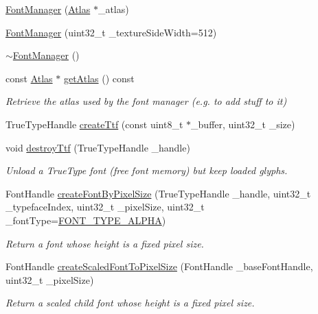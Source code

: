 \begin{DoxyCompactItemize}
\item 
\hyperlink{class_font_manager_ad508580de43f7ae8e599465e920a667b}{Font\+Manager} (\hyperlink{class_atlas}{Atlas} $\ast$\+\_\+atlas)
\item 
\hyperlink{class_font_manager_a8e70d9a8d27b275c249cc2e6f1814599}{Font\+Manager} (uint32\+\_\+t \+\_\+texture\+Side\+Width=512)
\item 
\hyperlink{class_font_manager_aa190bb023b4cf2ad28e24c69ef57f380}{$\sim$\+Font\+Manager} ()
\item 
const \hyperlink{class_atlas}{Atlas} $\ast$ \hyperlink{class_font_manager_a8e27c0180aa58188e256f73f45b2efd4}{get\+Atlas} () const 
\begin{DoxyCompactList}\small\item\em Retrieve the atlas used by the font manager (e.\+g. to add stuff to it) \end{DoxyCompactList}\item 
True\+Type\+Handle \hyperlink{class_font_manager_aaae01d2d87df84d6abc12b99ed78fce3}{create\+Ttf} (const uint8\+\_\+t $\ast$\+\_\+buffer, uint32\+\_\+t \+\_\+size)
\item 
void \hyperlink{class_font_manager_af71a903546da32b824a491911fc81f98}{destroy\+Ttf} (True\+Type\+Handle \+\_\+handle)
\begin{DoxyCompactList}\small\item\em Unload a True\+Type font (free font memory) but keep loaded glyphs. \end{DoxyCompactList}\item 
Font\+Handle \hyperlink{class_font_manager_ac6478e79efdf486bc76f021495ff13fa}{create\+Font\+By\+Pixel\+Size} (True\+Type\+Handle \+\_\+handle, uint32\+\_\+t \+\_\+typeface\+Index, uint32\+\_\+t \+\_\+pixel\+Size, uint32\+\_\+t \+\_\+font\+Type=\hyperlink{font__manager_8h_a119102a78834acb4b005bbd03c92532a}{F\+O\+N\+T\+\_\+\+T\+Y\+P\+E\+\_\+\+A\+L\+P\+H\+A})
\begin{DoxyCompactList}\small\item\em Return a font whose height is a fixed pixel size. \end{DoxyCompactList}\item 
Font\+Handle \hyperlink{class_font_manager_a43503676adcf2c6ce5d1ded8cd2216aa}{create\+Scaled\+Font\+To\+Pixel\+Size} (Font\+Handle \+\_\+base\+Font\+Handle, uint32\+\_\+t \+\_\+pixel\+Size)
\begin{DoxyCompactList}\small\item\em Return a scaled child font whose height is a fixed pixel size. \end{DoxyCompactList}\item 

\end{DoxyCompactItemize}
